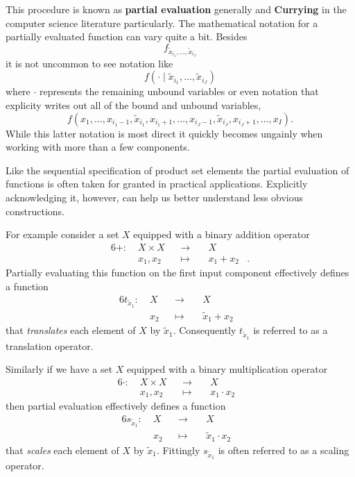 \documentclass[
  letterpaper,
  DIV=11,
  numbers=noendperiod]{scrartcl}
\begin{document}
This procedure is known as \textbf{partial evaluation} generally and
\textbf{Currying} in the computer science literature particularly. The
mathematical notation for a partially evaluated function can vary quite
a bit. Besides \[
f_{\tilde{x}_{i_{1}}, \ldots, \tilde{x}_{i_{J}}}
\] it is not uncommon to see notation like \[
f(\cdot \mid \tilde{x}_{i_{1}}, \ldots, \tilde{x}_{i_{J}})
\] where \(\cdot\) represents the remaining unbound variables or even
notation that explicity writes out all of the bound and unbound
variables, \[
f(x_{1}, \ldots, x_{i_{1} - 1}, \tilde{x}_{i_{1}}, x_{i_{1} + 1}, \ldots,
x_{i_{J} - 1}, \tilde{x}_{i_{J}}, x_{i_{J} + 1}, \ldots,
x_{I} ).
\] While this latter notation is most direct it quickly becomes ungainly
when working with more than a few components.

Like the sequential specification of product set elements the partial
evaluation of functions is often taken for granted in practical
applications. Explicitly acknowledging it, however, can help us better
understand less obvious constructions.

For example consider a set \(X\) equipped with a binary addition
operator \begin{alignat*}{6}
+ :\; & X \times X& &\rightarrow& \; & X &
\\
& x_{1}, x_{2} & &\mapsto& & x_{1} + x_{2} &.
\end{alignat*} Partially evaluating this function on the first input
component effectively defines a function \begin{alignat*}{6}
t_{\tilde{x}_{1}} :\; &X& &\rightarrow& \; & X &
\\
& x_{2} & &\mapsto& & \tilde{x}_{1} + x_{2} &
\end{alignat*} that \emph{translates} each element of \(X\) by
\(\tilde{x}_{1}\). Consequently \(t_{\tilde{x}_{1}}\) is referred to as
a translation operator.

Similarly if we have a set \(X\) equipped with a binary multiplication
operator \begin{alignat*}{6}
\cdot :\; & X \times X& &\rightarrow& \; & X &
\\
& x_{1}, x_{2} & &\mapsto& & x_{1} \cdot x_{2} &
\end{alignat*} then partial evaluation effectively defines a function
\begin{alignat*}{6}
s_{\tilde{x}_{1}} :\; &X& &\rightarrow& \; & X &
\\
& x_{2} & &\mapsto& & \tilde{x}_{1} \cdot x_{2} &
\end{alignat*} that \emph{scales} each element of \(X\) by
\(\tilde{x}_{1}\). Fittingly \(s_{\tilde{x}_{1}}\) is often referred to
as a scaling operator.
\end{document}
